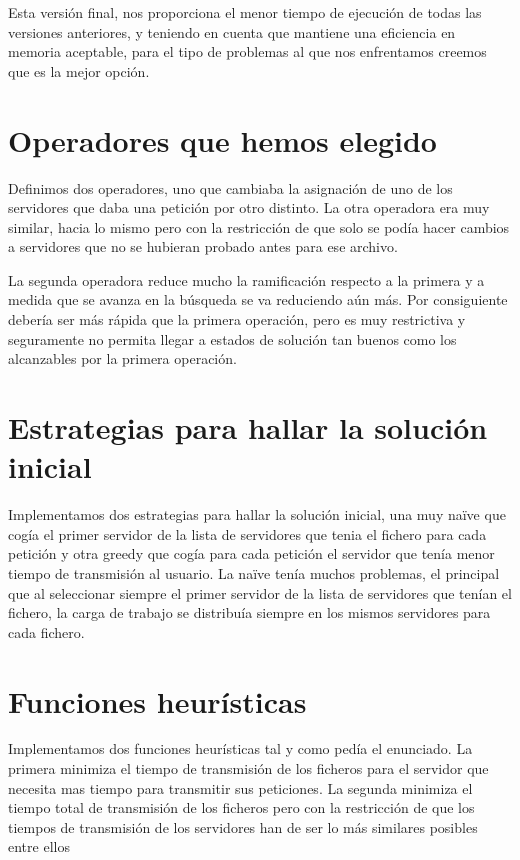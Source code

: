 Esta versión final, nos proporciona el menor tiempo de ejecución de todas las versiones anteriores, y teniendo en cuenta que mantiene una eficiencia en memoria aceptable, para el tipo de problemas al que nos enfrentamos creemos que es la mejor opción. 



\section{Operadores que hemos elegido}%
\label{sec:operadores_elegidos}

Definimos dos operadores, uno que cambiaba la asignación de uno de los servidores que daba una petición por otro distinto.
La otra operadora era muy similar, hacia lo mismo pero con la restricción de que solo se podía hacer cambios a servidores
que no se hubieran probado antes para ese archivo.

La segunda operadora reduce mucho la ramificación respecto a la primera y a medida que se avanza en la búsqueda se va
reduciendo aún más. Por consiguiente debería ser más rápida que la primera operación, pero es muy restrictiva y seguramente
no permita llegar a estados de solución tan buenos como los alcanzables por la primera operación.

\section{Estrategias para hallar la solución inicial}%
\label{sec:estrat_sol}

Implementamos dos estrategias para hallar la solución inicial, una muy naïve que cogía el primer servidor
de la lista de servidores que tenia el fichero para cada petición y otra greedy que cogía para cada petición
el servidor que tenía menor tiempo de transmisión al usuario. La naïve tenía muchos problemas, el principal
que al seleccionar siempre el primer servidor de la lista de servidores que tenían el fichero, la carga de
trabajo se distribuía siempre en los mismos servidores para cada fichero.

\pagebreak
\section{Funciones heurísticas}

Implementamos dos funciones heurísticas tal y como pedía el enunciado. La primera minimiza el tiempo de transmisión
de los ficheros para el servidor que necesita mas tiempo para transmitir sus peticiones. La segunda minimiza
el tiempo total de transmisión de los ficheros pero con la restricción de que los tiempos de transmisión de los servidores
han de ser lo más similares posibles entre ellos

